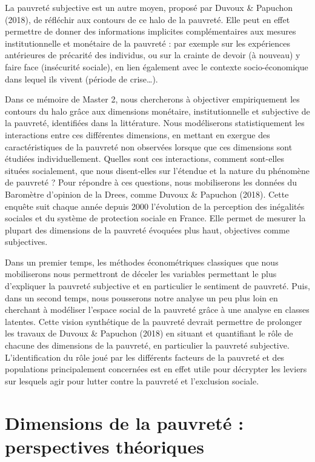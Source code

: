\documentclass[12pt,a4paper]{reedthesis}
\begin{document}
La pauvreté subjective est un autre moyen, proposé par Duvoux \& Papuchon (2018), de réfléchir aux contours de ce halo de la pauvreté. Elle peut en effet permettre de donner des informations implicites complémentaires aux mesures institutionnelle et monétaire de la pauvreté : par exemple sur les expériences antérieures de précarité des individus, ou sur la crainte de devoir (à nouveau) y faire face (insécurité sociale), en lien également avec le contexte socio-économique dans lequel ils vivent (période de crise\ldots).

Dans ce mémoire de Master 2, nous chercherons à objectiver empiriquement les contours du halo grâce aux dimensions monétaire, institutionnelle et subjective de la pauvreté, identifiées dans la littérature. Nous modéliserons statistiquement les interactions entre ces différentes dimensions, en mettant en exergue des caractéristiques de la pauvreté non observées lorsque que ces dimensions sont étudiées individuellement. Quelles sont ces interactions, comment sont-elles situées socialement, que nous disent-elles sur l'étendue et la nature du phénomène de pauvreté ?
Pour répondre à ces questions, nous mobiliserons les données du Baromètre d'opinion de la Drees, comme Duvoux \& Papuchon (2018). Cette enquête suit chaque année depuis 2000 l'évolution de la perception des inégalités sociales et du système de protection sociale en France. Elle permet de mesurer la plupart des dimensions de la pauvreté évoquées plus haut, objectives comme subjectives.

Dans un premier temps, les méthodes économétriques classiques que nous mobiliserons nous permettront de déceler les variables permettant le plus d'expliquer la pauvreté subjective et en particulier le sentiment de pauvreté. Puis, dans un second temps, nous pousserons notre analyse un peu plus loin en cherchant à modéliser l'espace social de la pauvreté grâce à une analyse en classes latentes. Cette vision synthétique de la pauvreté devrait permettre de prolonger les travaux de Duvoux \& Papuchon (2018) en situant et quantifiant le rôle de chacune des dimensions de la pauvreté, en particulier la pauvreté subjective. L'identification du rôle joué par les différents facteurs de la pauvreté et des populations principalement concernées est en effet utile pour décrypter les leviers sur lesquels agir pour lutter contre la pauvreté et l'exclusion sociale.

\hypertarget{chap1}{%
\chapter{Dimensions de la pauvreté : perspectives théoriques}\label{chap1}}
\end{document}

